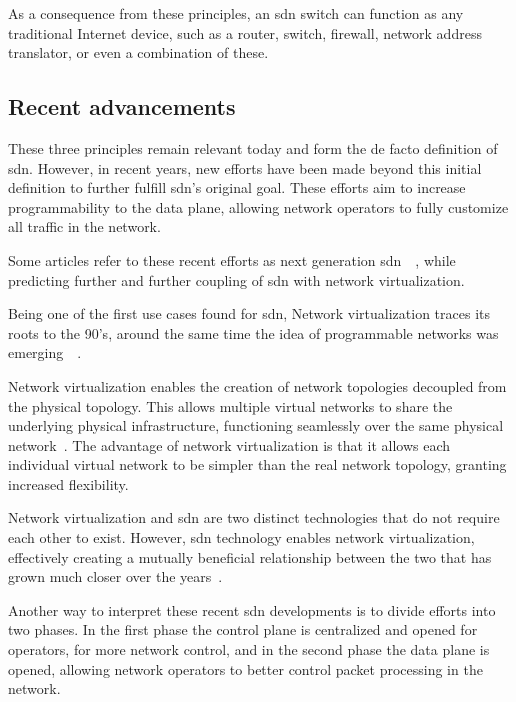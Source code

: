As a consequence from these principles, an \gls{sdn} switch can function as any traditional Internet device, such as a router, switch, firewall, network address translator, or even a combination of these. 

\subsection{Recent advancements}
These three principles remain relevant today and form the de facto definition of \gls{sdn}. However, in recent years, new efforts have been made beyond this initial definition to further fulfill \gls{sdn}'s original goal. These efforts aim to increase programmability to the data plane, allowing network operators to fully customize all traffic in the network.

Some articles refer to these recent efforts as next generation \gls{sdn}~\cite{liatifis_advancing_2023}~\cite{sofia_shaping_2024}, while predicting further and further coupling of \gls{sdn} with network virtualization.

Being one of the first use cases found for \gls{sdn}, Network virtualization traces its roots to the 90's, around the same time the idea of programmable networks was emerging~\cite{kreutz_software-defined_2015}~\cite{feamster_road_2013}.  

Network virtualization enables the creation of network topologies decoupled from the physical topology. This allows multiple virtual networks to share the underlying physical infrastructure, functioning seamlessly over the same physical network~\cite{thyagaturu_software_2016}.  The advantage of network virtualization is that it allows each individual virtual network to be simpler than the real network topology, granting increased flexibility. 

Network virtualization and \gls{sdn} are two distinct technologies that do not require each other to exist. However, \gls{sdn} technology enables network virtualization, effectively creating a mutually beneficial relationship between the two that has grown much closer over the years~\cite{feamster_road_2013}.

Another way to interpret these recent \gls{sdn} developments is to divide efforts into two phases. In the first phase the control plane is centralized and opened for operators, for more network control, and in the second phase the data plane is opened, allowing network operators to better control packet processing in the network. 

